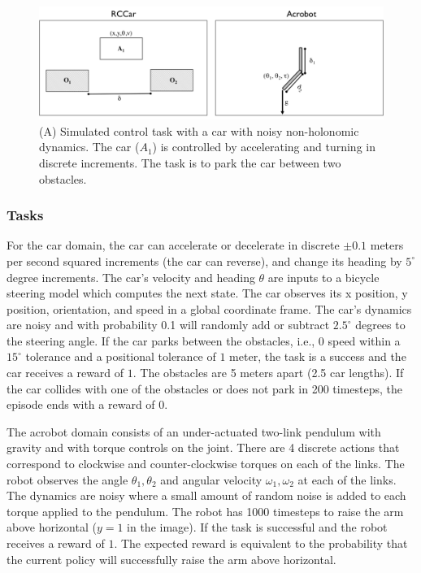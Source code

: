 \begin{figure}[ht!]
\centering
 \includegraphics[width=\columnwidth]{swirl-experiments/domains.png}
 \caption{(A) Simulated control task with a car with noisy non-holonomic dynamics. The car ($A_1$) is controlled by accelerating and turning in discrete increments. The task is to park the car between two obstacles. \label{domains}}
\end{figure}

\subsubsection{Tasks}
For the car domain, the car can accelerate or decelerate in discrete $\pm 0.1$ meters per second squared increments (the car can reverse), and change its heading by $5^\circ$ degree increments.
The car's velocity and heading $\theta$ are inputs to a bicycle steering model which computes the next state.
The car observes its x position, y position, orientation, and speed in a global coordinate frame.
The car's dynamics are noisy and with probability 0.1 will randomly add or subtract $2.5^\circ$ degrees to the steering angle.
If the car parks between the obstacles, i.e., 0 speed within a $15^\circ$ tolerance and a positional tolerance of $1$ meter, the task is a success and the car receives a reward of $1$. 
The obstacles are 5 meters apart (2.5 car lengths).
If the car collides with one of the obstacles or does not park in 200 timesteps, the episode ends with a reward of $0$.

The acrobot domain consists of an under-actuated two-link pendulum with gravity and with torque controls on the joint. 
There are 4 discrete actions that correspond to clockwise and counter-clockwise torques on each of the links. 
The robot observes the angle $\theta_1, \theta_2$ and angular velocity $\omega_1, \omega_2$ at each of the links.
The dynamics are noisy where a small amount of random noise is added to each torque applied to the pendulum. 
The robot has 1000 timesteps to raise the arm above horizontal ($y=1$ in the image). If the task is successful and the robot receives a reward of $1$. 
The expected reward is equivalent to the probability that the current policy will successfully raise the arm above horizontal.


